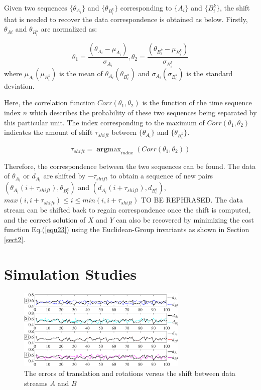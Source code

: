 \documentclass[letterpaper, 10 pt, conference]{ieeeconf}  %
\begin{document}
Given two sequences $\{\theta_{A_{i}}\}$ and $\{\theta_{B_{i}^{k}}\}$ corresponding to  $\{A_{i}\}$ and $\{B_{i}^{k}\}$, the shift that is needed to recover the data correspondence is obtained as below.
Firstly, $\theta_{Ai}$ and $\theta_{B_{i}^{k}}$ are normalized as:

\begin{equation}\label{equ29}
    \theta_{1}=\frac{(\theta_{A_{i}}-\mu_{A_{i}})}{\sigma_{A_{i}}}, \theta_{2}=\frac{(\theta_{B_{i}^{k}}-\mu_{B_{i}^{k}})}{\sigma_{B_{i}^{k}}}
\end{equation}
where $\mu_{A_{i}}(\mu_{B_{i}^{k}})$ is the mean of $\theta_{A_{i}}(\theta_{B_{i}^{k}})$ and $\sigma_{A_{i}}(\sigma_{B_{i}^{k}})$ is the standard deviation.

Here, the correlation function $Corr(\theta_{1},\theta_{2})$  is the function of the time sequence index $n$ which describes the probability of these two sequences being separated by this particular unit. The index corresponding to the maximum of $Corr(\theta_{1},\theta_{2})$  indicates the amount of shift $\tau_{shift}$ between $\{\theta_{A_{i}}\}$ and $\{\theta_{B_{i}^{k}}\}$.

\begin{equation}\label{equ30}
    \tau_{shift} = \mathop{\mathbf{arg}max}_{index}(Corr(\theta_{1},\theta_{2}))
\end{equation}

Therefore, the correspondence between the two sequences can be found. {\color{red}The data of $\theta_{A_{i}}$ or $d_{A_{i}}$ are shifted by $-\tau_{shift}$ to obtain a sequence of new pairs $(\theta_{A_{i}}(i+\tau_{shift}),\theta_{B_{i}^{k}})$ and $(d_{A_{i}}(i+\tau_{shift}),d_{B_{i}^{k}})$, $max(i,i+\tau_{shift})\leq i \leq min(i,i+\tau_{shift})$ TO BE REPHRASED}. The data stream can be shifted back to regain correspondence once the shift is computed, and the correct solution of $X$ and $Y$ can also be recovered by minimizing the cost function Eq.(\ref{equ23}) using the Euclidean-Group invariants as shown in Section \ref{sect2}.


\section{Simulation Studies}
\label{sect4}

\begin{center}
\begin{figure}
\centering
\includegraphics[width=3.2in]{fig3.eps}
\caption{
The errors of translation and rotations versus the shift between data streams $A$ and $B$
}
\label{fig2}
\end{figure}
\end{center}
\end{document}
